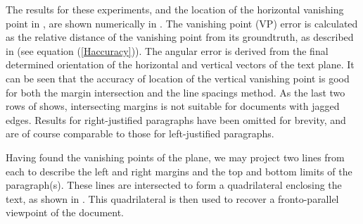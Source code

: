 
The results for these experiments, and the location of the horizontal vanishing
point in , are shown numerically in
. 
The vanishing point (VP) error is calculated as the relative distance of the
vanishing point from its groundtruth, as described in  (see equation (\ref{Haccuracy})). 
The angular error is derived from the final determined orientation of the
horizontal and vertical vectors of the text plane. 
It can be seen that the accuracy of location of the vertical vanishing point is
good for both the margin intersection and the line spacings method. 
As the last two rows of  shows, intersecting margins is not
suitable for documents with jagged edges.
Results for right-justified paragraphs have been omitted for brevity, and are of course
comparable to those for left-justified paragraphs.


Having found the vanishing points of the plane, we may project two lines from each
to describe the left and right margins and the top and bottom limits of the
paragraph(s). 
These lines are intersected to form a quadrilateral enclosing the text,
as shown in . %
This quadrilateral is then used to recover a fronto-parallel viewpoint
of the document.


